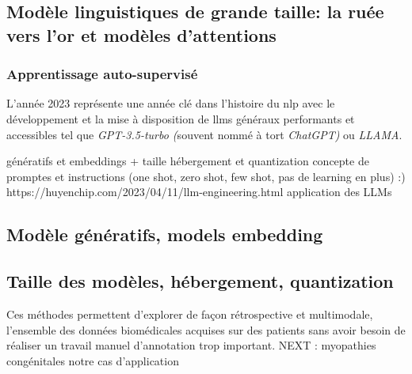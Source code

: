 \subsection{Modèle linguistiques de grande taille: la ruée vers l'or et modèles d'attentions}
\subsubsection{Apprentissage auto-supervisé}
L’année 2023 représente une année clé dans l’histoire du \gls{nlp} avec le développement et la mise à disposition de \gls{llms} généraux performants et accessibles tel que \textit{GPT-3.5-turbo (}souvent nommé à tort \textit{ChatGPT)} ou \textit{LLAMA}. 


génératifs et embeddings + taille hébergement et quantization
concepte de promptes et instructions (one shot, zero shot, few shot, pas de learning en plus) :)
https://huyenchip.com/2023/04/11/llm-engineering.html application des LLMs


\subsection{Modèle génératifs, models embedding}
\subsection{Taille des modèles, hébergement, quantization}

Ces méthodes permettent d’explorer de façon rétrospective et multimodale, l’ensemble des données biomédicales acquises sur des patients sans avoir besoin de réaliser un travail manuel d’annotation trop important. NEXT : myopathies congénitales notre cas d'application
